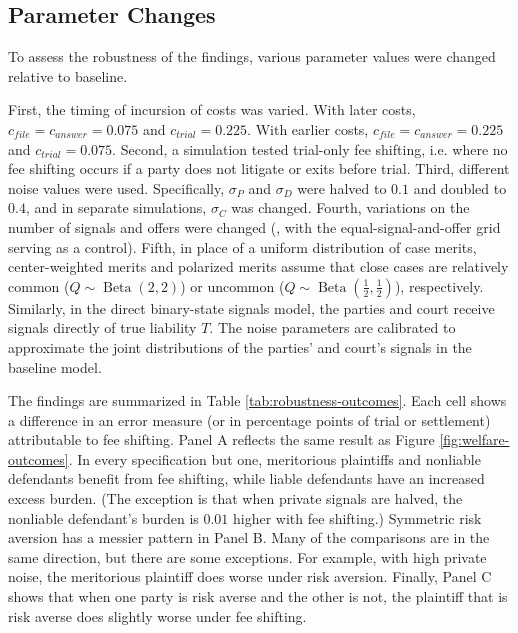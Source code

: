 \documentclass{article}
\begin{document}
\subsection{Parameter Changes}
\label{sec:parameter-changes}

To assess the robustness of the findings, various parameter values were changed relative to baseline. 

First, the timing of incursion of costs was varied. With later costs, $c_{file} = c_{answer} = 0.075$ and $c_{trial}=0.225$. With earlier costs, $c_{file} = c_{answer} = 0.225$ and $c_{trial}=0.075$. Second, a simulation tested trial-only fee shifting, i.e. where no fee shifting occurs if a party does not litigate or exits before trial. Third, different noise values were used. Specifically, $\sigma_P$ and $\sigma_D$ were halved to $0.1$ and doubled to $0.4$, and in separate simulations, $\sigma_C$ was changed. Fourth, variations on the number of signals and offers were changed (\ArticleGridSpecifications{}, with the equal-signal-and-offer grid serving as a control). Fifth, in place of a uniform distribution of case merits, center-weighted merits and polarized merits assume that close cases are relatively common ($Q \sim \operatorname{Beta}(2,2)$) or uncommon ($Q \sim \operatorname{Beta}(\frac{1}{2},\frac{1}{2})$), respectively. Similarly, in the direct binary-state signals model, the parties and court receive signals directly of true liability $T$. The noise parameters are calibrated to approximate the joint distributions of the parties' and court's signals in the baseline model.

The findings are summarized in Table \ref{tab:robustness-outcomes}. Each cell shows a difference in an error measure (or in percentage points of trial or settlement) attributable to fee shifting. Panel A reflects the same result as Figure \ref{fig:welfare-outcomes}. In every specification but one, meritorious plaintiffs and nonliable defendants benefit from fee shifting, while liable defendants have an increased excess burden. (The exception is that when private signals are halved, the nonliable defendant's burden is $0.01$ higher with fee shifting.) Symmetric risk aversion has a messier pattern in Panel B. Many of the comparisons are in the same direction, but there are some exceptions. For example, with high private noise, the meritorious plaintiff does worse under risk aversion. Finally, Panel C shows that when one party is risk averse and the other is not, the plaintiff that is risk averse does slightly worse under fee shifting.
\end{document}
